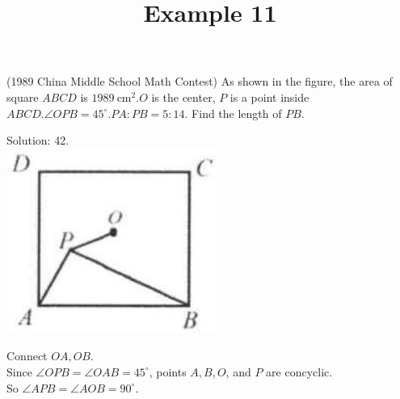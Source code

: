 \documentclass{article}
\title{Example 11}
\date{}
\begin{document}
\maketitle

(1989 China Middle School Math Contest) As shown in the figure, the area of square \(A B C D\) is \(1989 \mathrm{~cm}^{2} . O\) is the center, \(P\) is a point inside \(A B C D . \angle O P B=45^{\circ} . P A: P B=5: 14\). Find the length of \(P B\).

Solution: 42.\\
\centering
\includegraphics[width=\textwidth]{images/problem_image_1.jpg}

Connect \(O A, O B\).\\
Since \(\angle O P B=\angle O A B=45^{\circ}\), points \(A, B, O\), and \(P\) are concyclic.\\
So \(\angle A P B=\angle A O B=90^{\circ}\).
\end{document}
